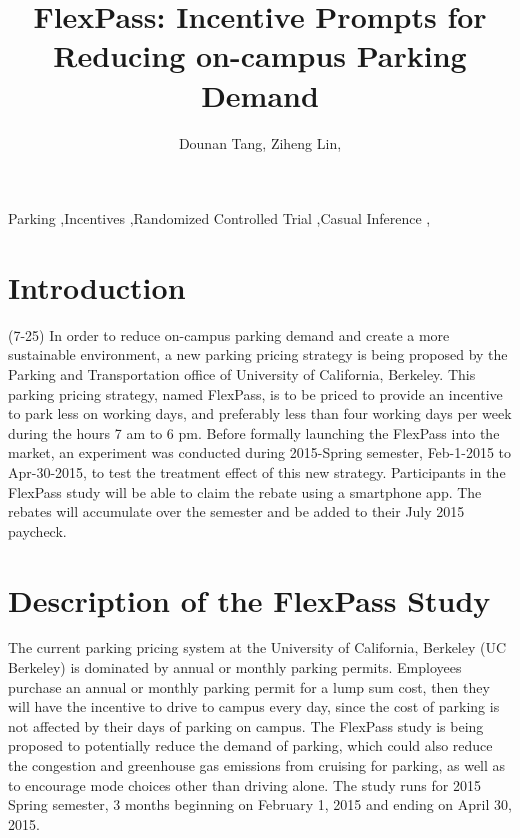 \documentclass[preprint,12pt]{elsarticle}
\begin{document}
\begin{frontmatter}

\title{FlexPass: Incentive Prompts for Reducing on-campus Parking Demand}

\author{Dounan Tang, Ziheng Lin,}

\address{University of California, Berkeley}

\begin{abstract}

\end{abstract}


\begin{keyword}
Parking \sep Incentives \sep Randomized Controlled Trial \sep Casual Inference \sep 

\end{keyword}

\end{frontmatter}

\section{Introduction} (7-25)
In order to reduce on-campus parking demand and create a more sustainable environment, a new parking pricing strategy is being proposed by the Parking and Transportation office of University of California, Berkeley. This parking pricing strategy, named FlexPass, is to be priced to provide an incentive to park less on working days, and preferably less than four working days per week during the hours 7 am to 6 pm. Before formally launching the FlexPass into the market, an experiment was conducted during 2015-Spring semester, Feb-1-2015 to Apr-30-2015, to test the treatment effect of this new strategy. Participants in the FlexPass study will be able to claim the rebate using a smartphone app. The rebates will accumulate over the semester and be added to their July 2015 paycheck. 

\section{Description of the FlexPass Study} 
The current parking pricing system at the University of California, Berkeley (UC Berkeley) is dominated by annual or monthly parking permits. Employees purchase an annual or monthly parking permit for a lump sum cost, then they will have the incentive to drive to campus every day, since the cost of parking is not affected by their days of parking on campus. The FlexPass study is being proposed to potentially reduce the demand of parking, which could also reduce the congestion and greenhouse gas emissions from cruising for parking, as well as to encourage mode choices other than driving alone. The study runs for 2015 Spring semester, 3 months beginning on February 1, 2015 and ending on April 30, 2015.
\end{document}
